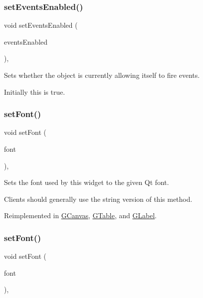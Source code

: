 \subsubsection{\texorpdfstring{set\+Events\+Enabled()}{setEventsEnabled()}}
{\footnotesize\ttfamily void set\+Events\+Enabled (\begin{DoxyParamCaption}\item[{bool}]{events\+Enabled }\end{DoxyParamCaption})\hspace{0.3cm}{\ttfamily [virtual]}, {\ttfamily [inherited]}}



Sets whether the object is currently allowing itself to fire events. 

Initially this is true. \mbox{\label{classGInteractor_a2592348886ffea646c6534bf88f7c49d}} 
\subsubsection{\texorpdfstring{set\+Font()}{setFont()}\hspace{0.1cm}{\footnotesize\ttfamily [1/2]}}
{\footnotesize\ttfamily void set\+Font (\begin{DoxyParamCaption}\item[{const Q\+Font \&}]{font }\end{DoxyParamCaption})\hspace{0.3cm}{\ttfamily [virtual]}, {\ttfamily [inherited]}}



Sets the font used by this widget to the given Qt font. 

Clients should generally use the string version of this method. 

Reimplemented in \mbox{\hyperlink{classGCanvas_a2d22014c7fa3bccfd58c982aea1b55fa}{G\+Canvas}}, \mbox{\hyperlink{classGTable_a2d22014c7fa3bccfd58c982aea1b55fa}{G\+Table}}, and \mbox{\hyperlink{classGLabel_a2d22014c7fa3bccfd58c982aea1b55fa}{G\+Label}}.

\mbox{\label{classGInteractor_a8e096e8818d838aceae1d46d58fb3a7b}} 
\subsubsection{\texorpdfstring{set\+Font()}{setFont()}\hspace{0.1cm}{\footnotesize\ttfamily [2/2]}}
{\footnotesize\ttfamily void set\+Font (\begin{DoxyParamCaption}\item[{const std\+::string \&}]{font }\end{DoxyParamCaption})\hspace{0.3cm}{\ttfamily [virtual]}, {\ttfamily [inherited]}}



